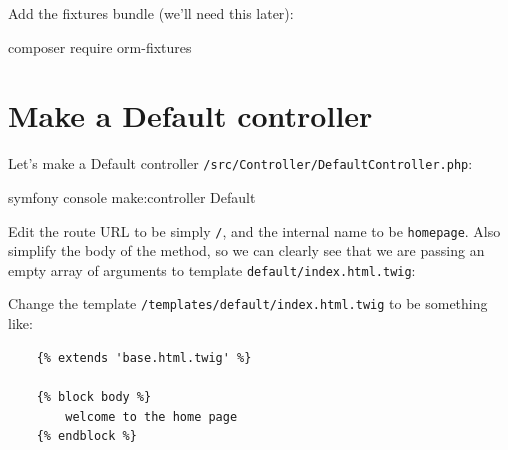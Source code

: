 \documentclass[a4paperpaper,openright]{book}
\newenvironment{Shaded}{}{}
\newcommand{\CommentTok}[1]{\textcolor[rgb]{0.38,0.63,0.69}{\textit{#1}}}
\newcommand{\ExtensionTok}[1]{#1}
\newcommand{\KeywordTok}[1]{\textcolor[rgb]{0.00,0.44,0.13}{\textbf{#1}}}
\newcommand{\NormalTok}[1]{#1}
\newcommand{\OtherTok}[1]{\textcolor[rgb]{0.00,0.44,0.13}{#1}}
\newcommand{\StringTok}[1]{\textcolor[rgb]{0.25,0.44,0.63}{#1}}
\begin{document}
Add the fixtures bundle (we'll need this later):

\begin{Shaded}
\begin{Highlighting}[]
    \ExtensionTok{composer}\NormalTok{ require orm-fixtures}
\end{Highlighting}
\end{Shaded}

\hypertarget{make-a-default-controller}{%
\section{Make a Default controller}\label{make-a-default-controller}}

Let's make a Default controller
\texttt{/src/Controller/DefaultController.php}:

\begin{Shaded}
\begin{Highlighting}[]
    \ExtensionTok{symfony}\NormalTok{ console make:controller Default}
\end{Highlighting}
\end{Shaded}

Edit the route URL to be simply \texttt{/}, and the internal name to be
\texttt{homepage}. Also simplify the body of the method, so we can
clearly see that we are passing an empty array of arguments to template
\texttt{default/index.html.twig}:

\begin{Shaded}
\end{Shaded}

Change the template \texttt{/templates/default/index.html.twig} to be
something like:

\begin{verbatim}
    {% extends 'base.html.twig' %}

    {% block body %}
        welcome to the home page
    {% endblock %}
\end{verbatim}
\end{document}
